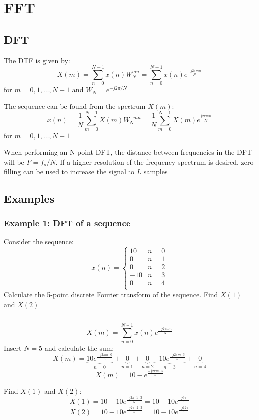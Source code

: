 \section{FFT}
\subsection{DFT}
The DTF is given by:
$$X(m)=\sum_{n=0}^{N-1}x(n)W_{N}^{m n}=\sum_{n=0}^{N-1}x(n)e^{\frac{-j2\pi m n}{N}}$$
for $m=0,1,\dots,N-1$ and $W_N=e^{-j2\pi/N}$

The sequence can be found from the spectrum $X(m)$:
$$x(n)=\frac{1}{N}\sum_{m=0}^{N-1}X(m)W_{N}^{-m n}=\frac{1}{N}\sum_{m=0}^{N-1}X(m)e^{\frac{j2\pi m n}{N}}$$
for $m=0,1,\dots,N-1$

When performing an N-point DFT, the distance between frequencies in the DFT will be $F=f_s/N$. If a higher resolution of the frequency spectrum is desired, zero filling can be used to increase the signal to $L$ samples
\subsection{Examples}
\subsubsection{Example 1: DFT of a sequence}
Consider the sequence:
$$x(n)=\begin{cases}
  10&n=0\\ 
  0&n=1\\
  0&n=2\\
  -10&n=3\\
  0&n=4\\
\end{cases}$$
Calculate the 5-point discrete Fourier transform of the sequence.
Find $X(1)$ and $X(2)$

\rule{\textwidth}{0.5pt}
$$X(m)=\sum_{n=0}^{N-1}x(n)e^{\frac{-j2\pi m n}{N}}$$
Insert $N=5$ and calculate the sum:
$$X(m)=\underbrace{10e^{\frac{-j2\pi m \cdot 0}{5}}}_{n=0}+\underbrace{0}_{n=1}+\underbrace{0}_{n=2}\underbrace{-10e^{\frac{-j2\pi m \cdot 3}{5}}}_{n=3}+\underbrace{0}_{n=4}$$
$$X(m)=10-e^{\frac{-j2\pi m \cdot 3}{5}}$$

Find $X(1)$ and $X(2)$:
$$X(1)=10-10e^{\frac{-j2\pi\cdot 1 \cdot 3}{5}}=10-10e^{\frac{-j6\pi\cdot}{5}}$$
$$X(2)=10-10e^{\frac{-j2\pi \cdot2 \cdot 3}{5}}=10-10e^{\frac{-j12\pi}{5}}$$

